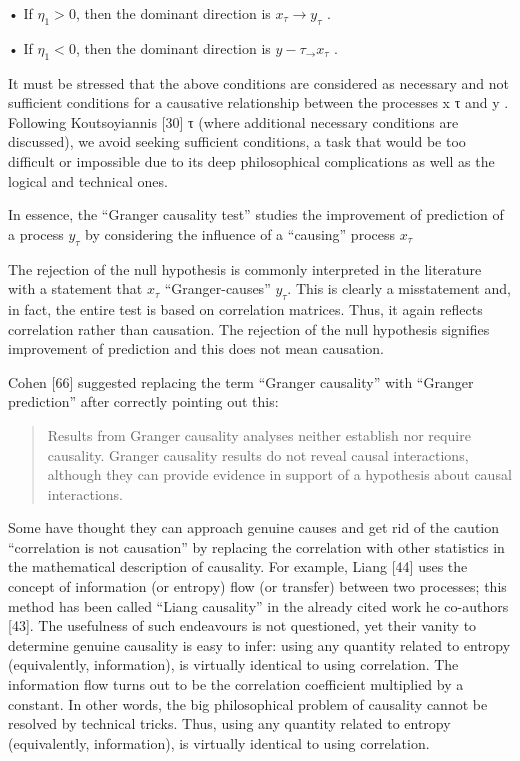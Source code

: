 \documentclass[
]{book}
\begin{document}
• If \(η_1 > 0\), then the dominant direction is \(x_τ → y_τ\) .

• If \(η_1 < 0\), then the dominant direction is \(y-τ_ → x_τ\) .

It must be stressed that the above conditions are considered as necessary and not sufficient
conditions for a causative relationship between the processes x τ and y . Following Koutsoyiannis {[}30{]}
τ
(where additional necessary conditions are discussed), we avoid seeking sufficient conditions, a task
that would be too difficult or impossible due to its deep philosophical complications as well as the
logical and technical ones.

In essence, the ``Granger causality test'' studies the improvement of prediction of a
process \(y_τ\) by considering the influence of a ``causing'' process \(x_τ\)

The rejection of the null hypothesis
is commonly interpreted in the literature with a statement that \(x_τ\) ``Granger-causes'' \(y_τ\).
This is clearly a misstatement and, in fact, the entire test is based on correlation matrices. Thus, it again reflects correlation rather than causation.
The rejection of the null hypothesis signifies improvement of prediction and
this does not mean causation.

Cohen {[}66{]} suggested replacing the term ``Granger causality'' with ``Granger prediction'' after
correctly pointing out this:

\begin{quote}
Results from Granger causality analyses neither establish nor require causality.
Granger causality results do not reveal causal interactions, although they can provide
evidence in support of a hypothesis about causal interactions.
\end{quote}

Some have thought they can approach genuine causes and get rid of the caution ``correlation is not
causation'' by replacing the correlation with other statistics in the mathematical description of causality.
For example, Liang {[}44{]} uses the concept of information (or entropy) flow (or transfer) between two
processes; this method has been called ``Liang causality'' in the already cited work he co-authors {[}43{]}.
The usefulness of such endeavours is not questioned, yet their vanity to determine genuine causality is
easy to infer: using any quantity
related to entropy (equivalently, information), is virtually identical to using correlation.
The information flow turns out to be the correlation coefficient multiplied by a constant.
In other words, the big philosophical
problem of causality cannot be resolved by technical tricks.
Thus, using any quantity related to entropy (equivalently, information),
is virtually identical to using correlation.
\end{document}
